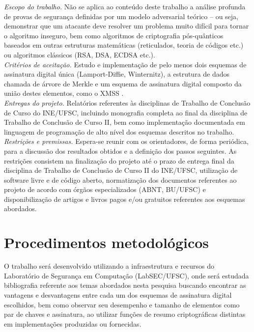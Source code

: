 \documentclass{ufsctex/ufsctex}
\begin{document}
\noindent \emph{Escopo do trabalho.} Não se aplica ao conteúdo deste trabalho
a análise profunda de provas de segurança definidas por um modelo adversarial
teórico -- ou seja, demonstrar que um atacante deve resolver um problema muito
difícil para tornar o algoritmo inseguro, bem como algoritmos de criptografia
pós-quânticos baseados em outras estruturas matemáticas (reticulados, teoria
de códigos etc.) ou algoritmos clássicos (RSA, DSA, ECDSA etc.). \\

\noindent \emph{Critérios de aceitação.} Estudo e implementação de pelo menos
dois esquemas de assinatura digital única (Lamport-Diffie, Winternitz),
a estrutura de dados chamada de árvore de Merkle e um esquema de assinatura
digital composto da união destes elementos, como o XMSS \cite{Buchmann2011}. \\

\noindent \emph{Entregas do projeto.} Relatórios referentes às disciplinas de
Trabalho de Conclusão de Curso do INE/UFSC, incluindo monografia completa ao
final da disciplina de Trabalho de Conclusão de Curso II, bem como
implementação documentada em linguagem de programação de alto nível dos
esquemas descritos no trabalho. \\

\noindent \emph{Restrições e premissas.} Espera-se reunir com os orientadores,
de forma periódica, para a discussão dos resultados obtidos e a definição dos
passos seguintes. As restrições consistem na finalização do projeto até o prazo
de entrega final da disciplina de Trabalho de Conclusão de Curso II do
INE/UFSC, utilização de software livre e de código aberto, normatização dos
documentos referentes ao projeto de acordo com órgãos especializados (ABNT,
BU/UFSC) e disponibilização de artigos e livros pagos e/ou gratuitos referentes
aos esquemas abordados.

\section{Procedimentos metodológicos}

O trabalho será desenvolvido utilizando a infraestrutura e recursos do
Laboratório de Segurança em Computação (LabSEC/UFSC), onde será estudada
bibliografia referente aos temas abordados nesta pesquisa buscando encontrar
as vantagens e desvantagens entre cada um dos esquemas de assinatura digital
escolhidos, bem como observar seu desempenho e tamanho de elementos como
par de chaves e assinatura, ao utilizar funções de resumo criptográficas
distintas em implementações produzidas ou fornecidas.
\end{document}
